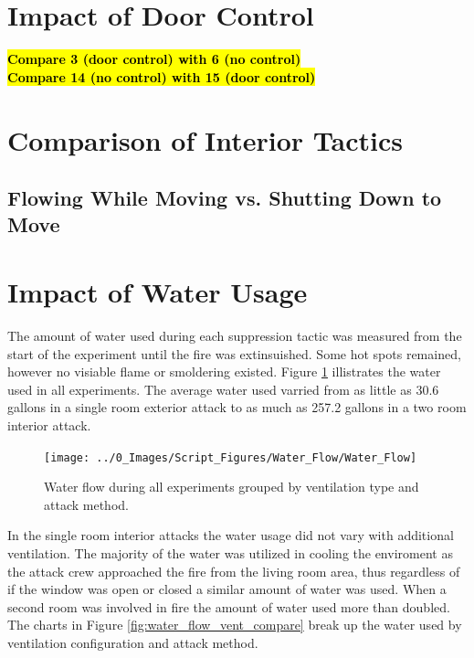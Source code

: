 \documentclass[12pt,oneside]{book}
\begin{document}
\section{Impact of Door Control}
\bf{\hl{Compare 3 (door control) with 6 (no control)}} \\
\bf{\hl{Compare 14 (no control) with 15 (door control)}} \\

\normalfont

\section{Comparison of Interior Tactics}

\subsection{Flowing While Moving vs. Shutting Down to Move}

\section{Impact of Water Usage}
The amount of water used during each suppression tactic was measured from the start of the experiment until the fire was extinsuished. Some hot spots remained, however no visiable flame or smoldering existed. Figure \ref{fig:water_flow_all} illistrates the water used in all experiments. The average water used varried from as little as 30.6 gallons in a single room exterior attack to as much as 257.2 gallons in a two room interior attack.

\begin{figure}[H]
\centering
\texttt{[image: ../0\_Images/Script\_Figures/Water\_Flow/Water\_Flow]}
\caption[Water Floor All Experiments]{Water flow during all experiments grouped by ventilation type and attack method.}
\label{fig:water_flow_all}
\end{figure}

In the single room interior attacks the water usage did not vary with additional ventilation. The majority of the water was utilized in cooling the enviroment as the attack crew approached the fire from the living room area, thus regardless of if the window was open or closed a similar amount of water was used. When a second room was involved in fire the amount of water used more than doubled. The charts in Figure \ref{fig:water_flow_vent_compare} break up the water used by ventilation configuration and attack method.  
\end{document}
